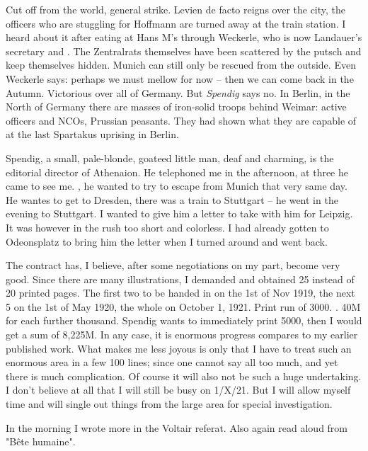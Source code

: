 
Cut off from the world, general strike. Levien de facto reigns over the city, the officers who are stuggling for Hoffmann are turned away at the train station. I heard about it after eating at Hans M's through Weckerle, who is now Landauer's secretary and . The Zentralrats themselves have been scattered by the putsch and keep themselves hidden. Munich can still only be rescued from the outside. Even Weckerle says: perhaps we must mellow for now -- then we can come back in the Autumn. Victorious over all of Germany. But \textit{Spendig} says no. In Berlin, in the North of Germany there are masses of iron-solid troops behind Weimar: active officers and NCOs, Prussian peasants. They had shown what they are capable of at the last Spartakus uprising in Berlin.

Spendig, a small, pale-blonde, goateed little man, deaf and charming, is the editorial director of Athenaion. He telephoned me in the afternoon, at three he came to see me. , he wanted to try to escape from Munich that very same day. He wantes to get to Dresden, there was a train to Stuttgart -- he went in the evening to Stuttgart. I wanted to give him a letter to take with him for Leipzig. It was however in the rush too short and colorless. I had already gotten to Odeonsplatz to bring him the letter when I turned around and went back.

The contract has, I believe, after some negotiations on my part, become very good. Since there are many illustrations, I demanded and obtained 25 instead of 20 printed pages. The first two to be handed in on the 1st of Nov 1919, the next 5 on the 1st of May 1920, the whole on October 1, 1921. Print run of 3000. . 40M for each further thousand. Spendig wants to immediately print 5000, then I would get a sum of 8,225M. In any case, it is enormous progress compares to my earlier published work. What makes me less joyous is only that I have to treat such an enormous area in a few 100 lines; since one cannot say all too much, and yet there is much complication. Of course it will also not be such a huge undertaking. I don't believe at all that I will still be busy on 1/X/21. But I will allow myself time and will single out things from the large area for special investigation.

In the morning I wrote more in the Voltair referat. Also again read aloud from "Bête humaine".